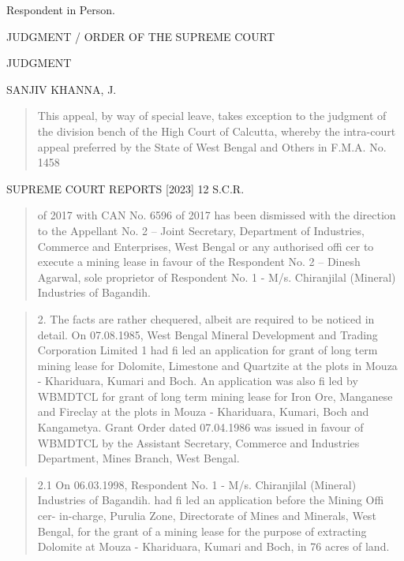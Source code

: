 \documentclass[12pt,a4paper]{article}
\newenvironment{judgequote}
  {\begin{quote}\small}
  {\end{quote}}
\begin{document}
\noindent Respondent in Person.


\noindent JUDGMENT / ORDER OF THE SUPREME COURT


\noindent JUDGMENT


\noindent SANJIV KHANNA, J.


\begin{judgequote}
This appeal, by way of special leave, takes exception to the judgment
of the division bench of the High Court of Calcutta, whereby the intra-court
appeal preferred by the State of West Bengal and Others in F.M.A. No. 1458
\end{judgequote}



 SUPREME COURT REPORTS [2023] 12 S.C.R.


\begin{judgequote}
of 2017 with CAN No. 6596 of 2017 has been dismissed with the direction to
the Appellant No. 2 -- Joint Secretary, Department of Industries, Commerce
and Enterprises, West Bengal or any authorised offi cer to execute a mining
lease in favour of the Respondent No. 2 -- Dinesh Agarwal, sole proprietor
of Respondent No. 1 - M/s. Chiranjilal (Mineral) Industries of Bagandih.
\end{judgequote}

\begin{judgequote}
2. The facts are rather chequered, albeit are required to be noticed
in detail. On 07.08.1985, West Bengal Mineral Development and Trading
Corporation Limited 1 had fi led an application for grant of long term mining
lease for Dolomite, Limestone and Quartzite at the plots in Mouza -
Khariduara, Kumari and Boch. An application was also fi led by WBMDTCL
for grant of long term mining lease for Iron Ore, Manganese and Fireclay
at the plots in Mouza - Khariduara, Kumari, Boch and Kangametya. Grant
Order dated 07.04.1986 was issued in favour of WBMDTCL by the Assistant
Secretary, Commerce and Industries Department, Mines Branch, West
Bengal.
\end{judgequote}

\begin{judgequote}
2.1 On 06.03.1998, Respondent No. 1 - M/s. Chiranjilal (Mineral)
Industries of Bagandih. had fi led an application before the Mining Offi cer-
in-charge, Purulia Zone, Directorate of Mines and Minerals, West Bengal,
for the grant of a mining lease for the purpose of extracting Dolomite at
Mouza - Khariduara, Kumari and Boch, in 76 acres of land.
\end{judgequote}
\end{document}
